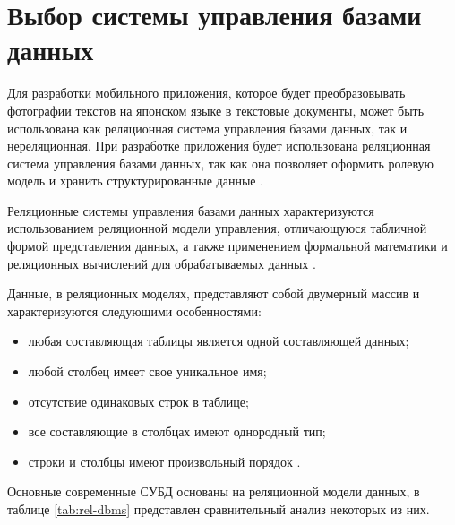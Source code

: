\section{Выбор системы управления базами данных}

Для разработки мобильного приложения, которое будет преобразовывать
фотографии текстов на японском языке в текстовые документы,
может быть использована как реляционная система управления
базами данных, так и нереляционная. При разработке приложения
будет использована реляционная система управления базами данных,
так как она позволяет оформить ролевую модель и хранить структурированные
данные \cite{nosql}.

Реляционные системы управления базами данных характеризуются
использованием реляционной модели управления, отличающуюся
табличной формой представления данных, а также применением
формальной математики и реляционных вычислений для обрабатываемых
данных \cite{bdbms}.

Данные, в реляционных моделях, представляют собой двумерный
массив и характеризуются следующими особенностями:

\begin{itemize}[label={$-$}]
  \item любая составляющая таблицы является одной
составляющей данных;
  \item любой столбец имеет свое уникальное имя;
  \item отсутствие одинаковых строк в таблице;
  \item все составляющие в столбцах имеют однородный тип;
  \item строки и столбцы имеют произвольный порядок \cite{relational-dbms}.
\end{itemize}

Основные современные СУБД основаны на реляционной модели данных,
в таблице \ref{tab:rel-dbms} представлен сравнительный анализ
некоторых из них.

\clearpage

